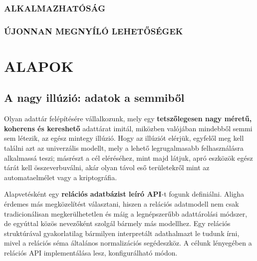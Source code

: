 \documentclass[
    parspace,
    noindent,
    nohyp,
]{elteiktdk}[2023/04/10]
\begin{document}

\subsection{ALKALMAZHATÓSÁG}




\subsection{ÚJONNAN MEGNYÍLÓ LEHETŐSÉGEK}











\chapter{ALAPOK}

\section{A nagy illúzió: adatok a semmiből}

Olyan adattár felépítésére vállalkozunk,
mely egy \textbf{tetszőlegesen nagy méretű, koherens és kereshető} adattárat imitál,
miközben valójában mindebből semmi sem létezik, az egész mintegy illúzió.
Hogy az illúziót elérjük, egyfelől meg kell találni azt az univerzális modellt,
mely a lehető legrugalmasabb felhasználásra alkalmassá teszi;
másrészt a cél eléréséhez, mint majd látjuk, apró eszközök egész tárát kell összeverbuválni,
akár olyan távol eső területekről mint az automataelmélet vagy a kriptográfia.


Alapvetésként egy \textbf{relációs adatbázist leíró API}-t fogunk definiálni.
Aligha érdemes más megközelítést választani,
hiszen a relációs adatmodell nem csak tradicionálisan megkerülhetetlen
és máig a legnépszerűbb adattárolási módszer,
de egyúttal közös nevezőként szolgál bármely más modellhez.
Egy relációs struktúrával gyakorlatilag bármilyen interpretált adathalmazt le tudunk írni,
mivel a relációs séma általános normalizációs segédeszköz.
A célunk lényegében a relációs API implementálása lesz, konfigurálható módon.
\end{document}
